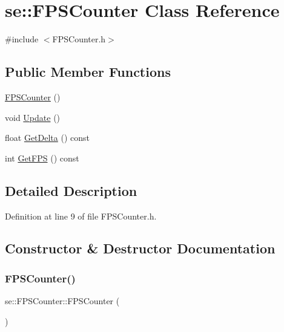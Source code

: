 \hypertarget{classse_1_1_f_p_s_counter}{}\section{se\+:\+:F\+P\+S\+Counter Class Reference}
\label{classse_1_1_f_p_s_counter}


{\ttfamily \#include $<$F\+P\+S\+Counter.\+h$>$}

\subsection*{Public Member Functions}
\begin{DoxyCompactItemize}
\item 
\mbox{\hyperlink{classse_1_1_f_p_s_counter_ad9b3e1f8314a41194aced879a346d32b}{F\+P\+S\+Counter}} ()
\item 
void \mbox{\hyperlink{classse_1_1_f_p_s_counter_a863da58355d25fcf9f76b9cc697101e4}{Update}} ()
\item 
float \mbox{\hyperlink{classse_1_1_f_p_s_counter_ac39be1bd1ff3954813d6d5733825abb1}{Get\+Delta}} () const
\item 
int \mbox{\hyperlink{classse_1_1_f_p_s_counter_a6e3fc56e01f9696ce549264f6246fa01}{Get\+F\+PS}} () const
\end{DoxyCompactItemize}


\subsection{Detailed Description}


Definition at line 9 of file F\+P\+S\+Counter.\+h.



\subsection{Constructor \& Destructor Documentation}
\mbox{\label{classse_1_1_f_p_s_counter_ad9b3e1f8314a41194aced879a346d32b}} 
\subsubsection{\texorpdfstring{F\+P\+S\+Counter()}{FPSCounter()}}
{\footnotesize\ttfamily se\+::\+F\+P\+S\+Counter\+::\+F\+P\+S\+Counter (\begin{DoxyParamCaption}{ }\end{DoxyParamCaption})}



